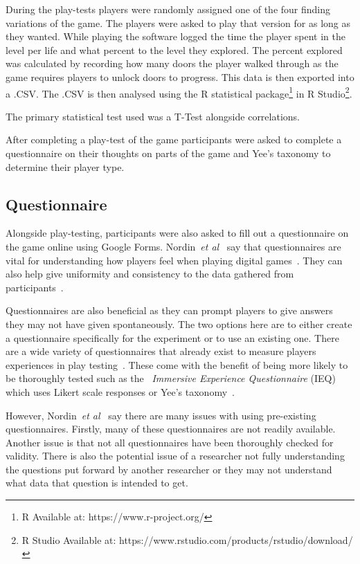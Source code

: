 \documentclass[journal]{IEEEtran}
\begin{document}
	During the play-tests players were randomly assigned one of the four finding variations of the game. The players were asked to play that version for as long as they wanted. While playing the software logged the time the player spent in the level per life and what percent to the level they explored. The percent explored was calculated by recording how many doors the player walked through as the game requires players to unlock doors to progress. This data is then exported into a .CSV. The .CSV is then analysed using the R statistical package\footnote[2]{R Available at: https://www.r-project.org/} in R Studio\footnote[3]{R Studio Available at: https://www.rstudio.com/products/rstudio/download/}.
	
	
	The primary statistical test used was a T-Test alongside correlations.
	
	After completing a play-test of the game participants were asked to complete a questionnaire on their thoughts on parts of the game and Yee's taxonomy to determine their player type.
	
	\subsection{Questionnaire} \label{Questionnaire}
	
	Alongside play-testing, participants were also asked to fill out a questionnaire on the game online using Google Forms. Nordin~\textit{et al}~\cite{nordin2014} say that questionnaires are vital for understanding how players feel when playing digital games~\cite{nordin2014,Denisova2016}. They can also help give uniformity and consistency to the data gathered from participants~\cite{Denisova2016}.
	
	Questionnaires are also beneficial as they can prompt players to give answers they may not have given spontaneously. The two options here are to either create a questionnaire specifically for the experiment or to use an existing one. There are a wide variety of questionnaires that already exist to measure players experiences in play testing~\cite{nordin2014, Jennett2008}. These come with the benefit of being more likely to be thoroughly tested such as the~\textit{ Immersive Experience Questionnaire} (IEQ) which uses Likert scale responses or Yee's taxonomy~\cite{nordin2014, Jennett2008, Yee2006, Yee2012}.
	
	However, Nordin~\textit{et al}~\cite{nordin2014} say there are many issues with using pre-existing questionnaires. Firstly, many of these questionnaires are not readily available. Another issue is that not all questionnaires have been thoroughly checked for validity. There is also the potential issue of a researcher not fully understanding the questions put forward by another researcher or they may not understand what data that question is intended to get.
	
\end{document}
